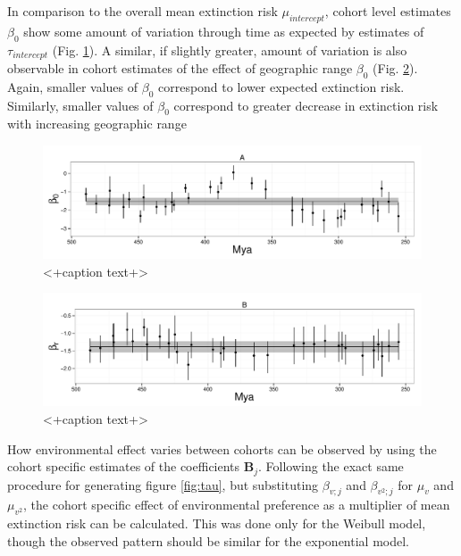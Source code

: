 \documentclass[12pt,letterpaper]{article}
\begin{document}
In comparison to the overall mean extinction risk \(\mu_{intercept}\), cohort level estimates \(\beta_{0}\) show some amount of variation through time as expected by estimates of \(\tau_{intercept}\) (Fig. \ref{fig:cohort_intercept}). A similar, if slightly greater, amount of variation is also observable in cohort estimates of the effect of geographic range \(\beta_{0}\) (Fig. \ref{fig:cohort_range}). Again, smaller values of \(\beta_{0}\) correspond to lower expected extinction risk. Similarly, smaller values of \(\beta_{0}\) correspond to greater decrease in extinction risk with increasing geographic range 
\begin{figure}[ht]
  \centering
  \includegraphics[height = 0.5\textheight,width=\textwidth,keepaspectratio=true]{figure/intercept_cohort}
  \caption{<+caption text+>}
  \label{fig:cohort_intercept}
\end{figure}

\begin{figure}[ht]
  \centering
  \includegraphics[height = 0.5\textheight,width=\textwidth,keepaspectratio=true]{figure/range_cohort}
  \caption{<+caption text+>}
  \label{fig:cohort_range}
\end{figure}

How environmental effect varies between cohorts can be observed by using the cohort specific estimates of the coefficients \(\mathbf{B}_{j}\). Following the exact same procedure for generating figure \ref{fig:tau}, but substituting \(\beta_{v; j}\) and \(\beta_{v^{2}; j}\) for \(\mu_{v}\) and \(\mu_{v^{2}}\), the cohort specific effect of environmental preference as a multiplier of mean extinction risk can be calculated. This was done only for the Weibull model, though the observed pattern should be similar for the exponential model. 
\end{document}
